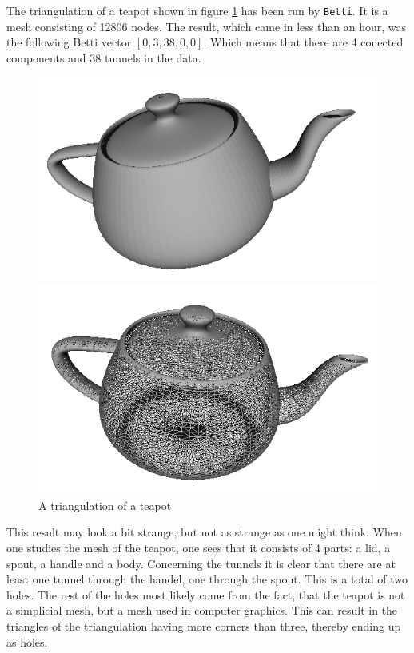 \documentclass[11pt,a4paper,twoside]{report}
\begin{document}
The triangulation of a teapot shown in figure \ref{fig:teapot} has been run by \texttt{Betti}. It is a mesh consisting of 12806 nodes. The result, which came in less than an hour, was the following Betti vector $[0,3,38,0,0]$. Which means that there are 4 conected components and 38 tunnels in the data.
\begin{figure}[H]
\begin{minipage}[b]{0.45\linewidth}
\center
\includegraphics[scale=0.5]{teapot00.png}
\end{minipage}
\hspace{0.5cm}
\begin{minipage}[b]{0.45\linewidth}
\center
\includegraphics[scale=0.5]{teapot01.png}
\end{minipage}
\caption{A triangulation of a teapot}
\label{fig:teapot}
\end{figure}
This result may look a bit strange, but not as strange as one might think. When one studies the mesh of the teapot, one sees that it consists of 4 parts: a lid, a spout, a handle and a body. Concerning the tunnels it is clear that there are at least one tunnel through the handel, one through the spout. This is a total of two holes. The rest of the holes most likely come from the fact, that the teapot is not a simplicial mesh, but a mesh used in computer graphics. This can result in the triangles of the triangulation having more corners than three, thereby ending up as holes. 
\end{document}
